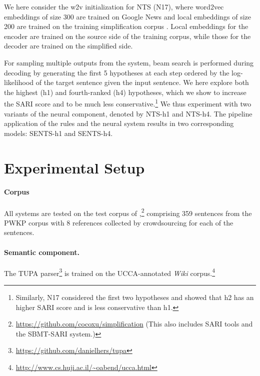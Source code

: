 \documentclass[11pt,a4paper]{article}
\begin{document}
We here consider the w2v initialization for NTS (N17), where word2vec embeddings of size 300 are trained on Google News \citep{M13a} and local embeddings of size 200 are trained on the training simplification corpus \citep{RS10, M13b}.
Local embeddings for the encoder are trained on the source side of the training corpus, while those for the decoder are trained on the simplified side.

For sampling multiple outputs from the system, beam search is performed during decoding by generating the first 5 hypotheses at each step ordered by the 
log-likelihood of the target sentence given the input sentence.
We here explore both the highest (h1) and fourth-ranked (h4) hypotheses, which we show to increase the SARI score and to be much less conservative.\footnote{Similarly, N17
considered the first two hypotheses and showed that h2 has an higher SARI score and is less conservative than h1.}
We thus experiment with two variants of the neural component, denoted by NTS-h1   and NTS-h4.
The pipeline application of the rules and the neural system results in two corresponding models: SENTS-h1 and SENTS-h4.

\vspace{-0.2cm}
\section{Experimental Setup}\label{sec:experiments}

\paragraph{Corpus}
All systems are tested on the test corpus of \citet{Xu16},\footnote{\url{https://github.com/cocoxu/simplification} (This also includes SARI tools and the SBMT-SARI system.)} comprising 359 sentences from the PWKP corpus \citep{Z10} with 8 references collected by crowdsourcing for each of the sentences. 
\vspace{-0.3cm}

\paragraph{Semantic component.}
The TUPA parser\footnote{\url{ https://github.com/danielhers/tupa}} is trained on the UCCA-annotated {\it Wiki} corpus.\footnote{\url{ http://www.cs.huji.ac.il/~oabend/ucca.html}}
\vspace{-0.2cm}
\end{document}
